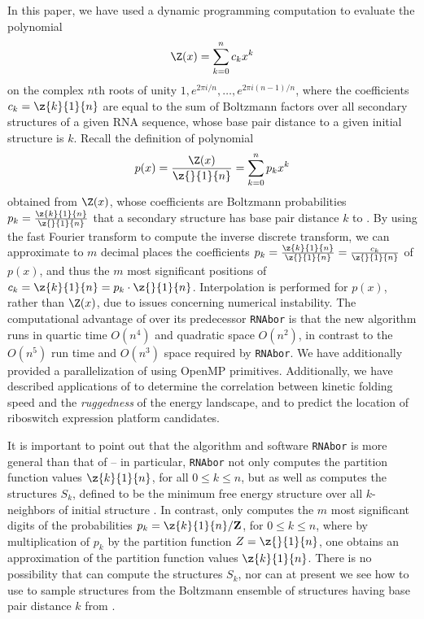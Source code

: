 In this paper, we have used a dynamic programming computation to
evaluate the polynomial
\begin{eqnarray}
\Z(x) = \sum_{k=0}^n c_k x^k
\end{eqnarray}
on the complex $n$th roots of unity $1,e^{2 \pi i/n},\ldots,
e^{2 \pi i (n-1)/n}$,
where the coefficients $c_k=\z{k}{1}{n}$ are equal to the sum of
Boltzmann factors over all secondary structures of a given RNA
sequence, whose base pair distance to a given initial structure \strSt
is $k$.  Recall the definition of polynomial
\begin{eqnarray}
p(x) = \frac{\Z(x)}{\z{}{1}{n}} = \sum_{k=0}^n p_k x^k
\end{eqnarray}
obtained from $\Z(x)$, whose coefficients are Boltzmann
probabilities $p_k=\frac{\z{k}{1}{n}}{\z{}{1}{n}}$ that a secondary
structure has base pair distance $k$ to \strSt.
By using the fast Fourier transform to compute the inverse
discrete transform, we can approximate  to $m$ decimal places the coefficients
$p_k=\frac{\z{k}{1}{n}}{\z{}{1}{n}} =\frac{c_k}{\z{}{1}{n}}$ of $p(x)$, and
thus the $m$ most significant positions of
$c_k=\z{k}{1}{n}=p_k \cdot \z{}{1}{n}$. Interpolation is performed for
$p(x)$, rather than $\Z(x)$, due to issues concerning numerical instability.
The computational advantage of \fftbor over its predecessor
{\tt RNAbor} \cite{Freyhult.b07} is that
the new algorithm runs in quartic time $O(n^4)$ and quadratic space
$O(n^2)$, in contrast to the $O(n^5)$ run time and $O(n^3)$ space
required by {\tt RNAbor}. We have additionally provided a
parallelization of \fftbor using OpenMP primitives.
Additionally, we have
described applications of \fftbor to determine the
correlation between kinetic folding speed and the {\em ruggedness}
of the energy landscape, and to predict the location of riboswitch
expression platform candidates.

It is important to point out that
the algorithm and software {\tt RNAbor} is more general than
that of \fftbor -- in particular, {\tt RNAbor} not only computes the
partition function values $\z{k}{1}{n}$, for all $0 \leq k \leq n$, but as
well as computes the
structures $S_k$, defined to be the minimum free energy structure over all
$k$-neighbors of initial structure \strSt.
In contrast, \fftbor only computes the $m$ most significant digits of
the probabilities $p_k = \z{k}{1}{n}/{\bf Z}$, for $0 \leq k \leq n$, where
by multiplication of $p_k$ by the partition function $Z=\z{}{1}{n}$,
one obtains an approximation of the partition function values $\z{k}{1}{n}$.
There is no possibility that \fftbor can compute the structures $S_k$,
nor can at present we see how to use \fftbor to sample structures from
the Boltzmann ensemble of structures having base pair distance $k$ from \strSt.

